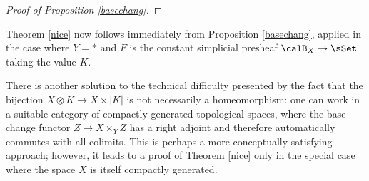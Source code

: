 \begin{proof}[Proof of Proposition \ref{basechang}]
\end{proof}

Theorem \ref{nice} now follows immediately from Proposition \ref{basechang}, applied in the case where $Y = \ast$ and $F$ is the constant simplicial presheaf $\calB_{X} \rightarrow \sSet$ taking the value $K$.

\begin{remark}
There is another solution to the technical difficulty presented by the fact that the bijection 
$X \otimes K \rightarrow X \times |K|$ is not necessarily a homeomorphism: one can work in a suitable category of compactly generated topological spaces, where the base change functor
$Z \mapsto X \times_Y Z$ has a right adjoint and therefore automatically commutes with all colimits.
This is perhaps a more conceptually satisfying approach; however, it leads to a proof of
Theorem \ref{nice} only in the special case where the space $X$ is itself compactly generated.
\end{remark}

